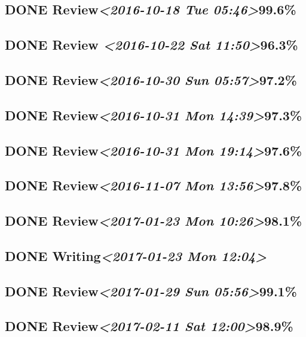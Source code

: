 \documentclass[11pt]{ctexart}
\begin{document}
\subsection{{\bfseries\sffamily DONE} Review\textit{<2016-10-18 Tue 05:46>}99.6\%}
\label{sec:org8a131a2}
\subsection{{\bfseries\sffamily DONE} Review \textit{<2016-10-22 Sat 11:50>}96.3\%}
\label{sec:org4d1dcce}
\subsection{{\bfseries\sffamily DONE} Review\textit{<2016-10-30 Sun 05:57>}97.2\%}
\label{sec:orgf74cda8}
\subsection{{\bfseries\sffamily DONE} Review\textit{<2016-10-31 Mon 14:39>}97.3\%}
\label{sec:org6550fa6}
\subsection{{\bfseries\sffamily DONE} Review\textit{<2016-10-31 Mon 19:14>}97.6\%}
\label{sec:orgf3e8df7}
\subsection{{\bfseries\sffamily DONE} Review\textit{<2016-11-07 Mon 13:56>}97.8\%}
\label{sec:org46d5d67}
\subsection{{\bfseries\sffamily DONE} Review\textit{<2017-01-23 Mon 10:26>}98.1\%}
\label{sec:org697285e}
\subsection{{\bfseries\sffamily DONE} Writing\textit{<2017-01-23 Mon 12:04>}}
\label{sec:org093fbce}
\subsection{{\bfseries\sffamily DONE} Review\textit{<2017-01-29 Sun 05:56>}99.1\%}
\label{sec:org9ba60a3}
\subsection{{\bfseries\sffamily DONE} Review\textit{<2017-02-11 Sat 12:00>}98.9\%}
\label{sec:orgc04cafb}
\end{document}
